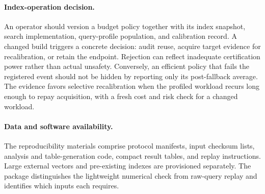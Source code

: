 \paragraph{Index-operation decision.}
An operator should version a budget policy together with its index snapshot, search implementation, query-profile population, and calibration record. A changed build triggers a concrete decision: audit reuse, acquire target evidence for recalibration, or retain the endpoint. Rejection can reflect inadequate certification power rather than actual unsafety. Conversely, an efficient policy that fails the registered event should not be hidden by reporting only its post-fallback average. The evidence favors selective recalibration when the profiled workload recurs long enough to repay acquisition, with a fresh cost and risk check for a changed workload.

\paragraph{Data and software availability.}
The reproducibility materials comprise protocol manifests, input checksum lists, analysis and table-generation code, compact result tables, and replay instructions. Large external vectors and pre-existing indexes are provisioned separately. The package distinguishes the lightweight numerical check from raw-query replay and identifies which inputs each requires.
